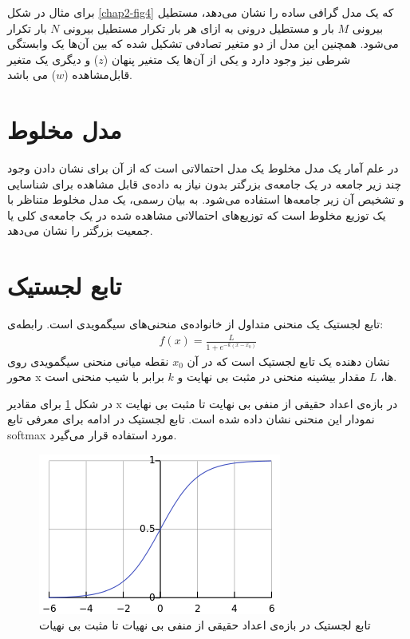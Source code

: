 برای مثال در شکل
\ref{chap2-fig4}
که یک مدل گرافی ساده را نشان می‌‌دهد، مستطیل بیرونی
$M$
بار و مستطیل درونی به ازای هر بار تکرار مستطیل بیرونی
$N$
بار تکرار می‌‌شود. همچنین این مدل از دو متغیر تصادفی تشکیل شده که بین آن‌ها یک وابستگی شرطی نیز وجود دارد و یکی‌ از آن‌ها یک متغیر پنهان
($z$)
و دیگری یک متغیر قابل‌مشاهده
($w$)
می‌ باشد.
\section{مدل مخلوط}
در علم آمار یک مدل مخلوط
یک مدل احتمالاتی است که از آن برای نشان دادن وجود چند زیر جامعه
در یک جامعه‌ی بزرگتر بدون نیاز به داده‌ی قابل مشاهده برای شناسایی‌ و تشخیص آن زیر جامعه‌ها استفاده می‌‌‌شود. به بیان رسمی‌، یک مدل مخلوط متناظر با یک توزیع مخلوط
 است که توزیع‌های احتمالاتی مشاهده شده در یک جامعه‌ی کلی‌ یا جمعیت بزرگتر را نشان می‌‌دهد.
	
\section{تابع لجستیک}
تابع لجستیک
 یک منحنی متداول از خانواده‌ی منحنی‌های سیگمویدی
  است. رابطه‌ی:
\begin{align}
	f(x) = \frac{L}{1+e^{-k(x-x_0)}}
	\label{eq1}
\end{align}
نشان دهنده یک تابع لجستیک است که در آن
$x_0$
نقطه میانی منحنی سیگمویدی روی محور
x
ها،
$L$
مقدار بیشینه منحنی در مثبت بی‌ نهایت و
$k$
برابر با شیب منحنی است.


 در شکل
\ref{fig3}
برای مقادیر x در بازه‌ی اعداد حقیقی‌ از منفی‌ بی‌ نهایت تا مثبت بی‌ نهایت نمودار این منحنی نشان داده شده است. تابع لجستیک در ادامه برای معرفی تابع
softmax
مورد استفاده قرار می‌‌گیرد.
\begin{figure}[!h]
	\centering
	\includegraphics[scale=0.5]{chap2-img/logistic_function}
	\caption{تابع لجستیک در بازه‌ی اعداد حقیقی‌ از منفی‌ بی‌ نهیات تا مثبت بی‌ نهیات }
	\label{fig3}
\end{figure}

